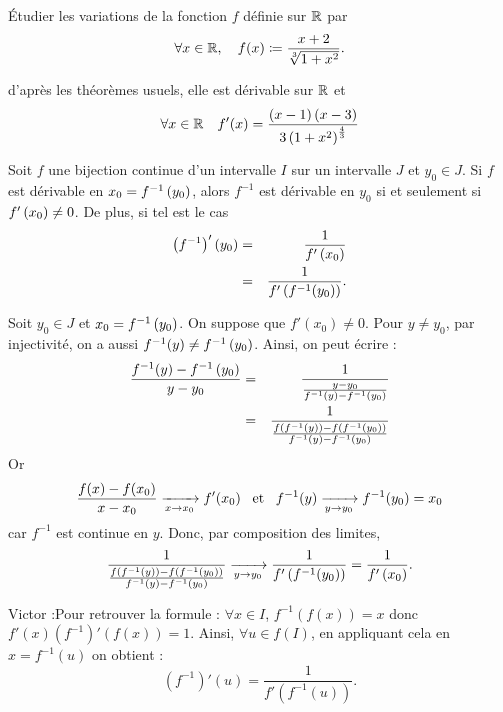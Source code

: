\documentclass{magnolia}
\begin{document}
\begin{exoUnique}
\exo Étudier les variations de la fonction $f$ définie sur $\mathbb{R}$ par
  \[\forall x\in\mathbb{R} ,\quad f(x)\coloneqq\frac{x+2}{\sqrt[3]{1+x^2}}.\]
  \begin{sol}
  d'après les théorèmes usuels, elle est dérivable sur $\mathbb{R}$ et
  \[\forall x\in\mathbb{R} \quad f'(x)=
    \frac{\left(x-1\right)\left(x-3\right)}{3\left(1+x^2\right)^{\frac{4}{3}}}\]    
  \end{sol}
\end{exoUnique}

\begin{proposition}[utile=-3]
Soit $f$ une bijection continue d'un intervalle $I$ sur un intervalle $J$ et
$y_0\in J$. Si $f$ est dérivable en $x_0=f^{-1}\left(y_0\right)$, alors $f^{-1}$
est dérivable en $y_0$ si et seulement si $f'\left(x_0\right)\neq 0$. De plus, si tel
est le cas
\begin{eqnarray*}
\left(f^{-1}\right)'\left(y_0\right)&=&\frac{1}{f'\left(x_0\right)}\\
&=&\frac{1}{f'\left(f^{-1}(y_0)\right)}.
\end{eqnarray*}
\end{proposition}

\begin{preuve}
Soit $y_0\in J$ et $x_0=f^{-1}\left(y_0\right)$. On suppose que $f'(x_0)\neq 0$.
Pour $y\neq y_0$, par injectivité, on a aussi $f^{-1}(y)\neq f^{-1}\left(y_0\right)$. Ainsi, on peut écrire :
\begin{eqnarray*}
\frac{f^{-1}(y)-f^{-1}\left(y_0\right)}{y-y_0}&=&\frac{1}{\frac{y-y_0}{f^{-1}(y)-f^{-1}\left(y_0\right)}}\\
&=&\frac{1}{\frac{f(f^{-1}(y))-f(f^{-1}(y_0))}{f^{-1}(y)-f^{-1}\left(y_0\right)}}
\end{eqnarray*}
Or $$\frac{f(x)-f(x_0)}{x-x_0}\xrightarrow[x\rightarrow x_0]{}f'(x_0) \quad\!\text{et}\quad\! f^{-1}(y)\xrightarrow[y\rightarrow y_0]{}f^{-1}(y_0)=x_0$$ car $f^{-1}$ est continue en $y$. Donc, par composition des limites, $$\frac{1}{\frac{f(f^{-1}(y))-f(f^{-1}(y_0))}{f^{-1}(y)-f^{-1}\left(y_0\right)}}\xrightarrow[y\rightarrow y_0]{}\frac{1}{f'\left(f^{-1}(y_0)\right)}=\frac{1}{f'\left(x_0\right)}.$$
\begin{victor}
Victor :Pour retrouver la formule : $\forall x \in I$, $f^{-1}(f(x))=x$ donc $f'(x)(f^{-1})'(f(x))=1$. Ainsi, $\forall u \in f(I)$, en appliquant cela en $x=f^{-1}(u)$ on obtient :
\[(f^{-1})'(u)=\frac{1}{f'(f^{-1}(u))}.\]
\end{victor}

\end{preuve}

\end{document}
